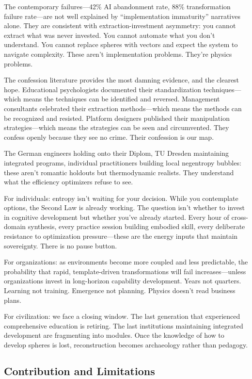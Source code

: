 The contemporary failures—42\% AI abandonment rate, 88\% transformation failure rate—are not well explained by ``implementation immaturity'' narratives alone. They are consistent with extraction-investment asymmetry: you cannot extract what was never invested. You cannot automate what you don't understand. You cannot replace spheres with vectors and expect the system to navigate complexity. These aren't implementation problems. They're physics problems.

The confession literature provides the most damning evidence, and the clearest hope. Educational psychologists documented their standardization techniques—which means the techniques can be identified and reversed. Management consultants celebrated their extraction methods—which means the methods can be recognized and resisted. Platform designers published their manipulation strategies—which means the strategies can be seen and circumvented. They confess openly because they see no crime. Their confession is our map.

The German engineers holding onto their Diplom, TU Dresden maintaining integrated programs, individual practitioners building local negentropy bubbles: these aren't romantic holdouts but thermodynamic realists. They understand what the efficiency optimizers refuse to see.

For individuals: entropy isn't waiting for your decision. While you contemplate options, the Second Law is already working. The question isn't whether to invest in cognitive development but whether you've already started. Every hour of cross-domain synthesis, every practice session building embodied skill, every deliberate resistance to optimization pressure—these are the energy inputs that maintain sovereignty. There is no pause button.

For organizations: as environments become more coupled and less predictable, the probability that rapid, template-driven transformations will fail increases—unless organizations invest in long-horizon capability development. Years not quarters. Learning not training. Emergence not planning. Physics doesn't read business plans.

For civilization: we face a closing window. The last generation that experienced comprehensive education is retiring. The last institutions maintaining integrated development are fragmenting into modules. Once the knowledge of how to develop spheres is lost, reconstruction becomes archaeology rather than pedagogy.

\subsection*{Contribution and Limitations}

